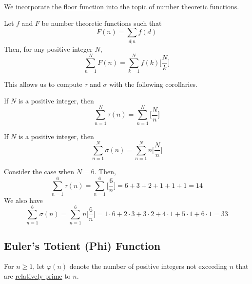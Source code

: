 \documentclass{article}
\newcounter{theorem}[section]
\newcounter{definition}[section]
\newcounter{example}[section]
\begin{document}
We incorporate the \hyperref[def:floor-function]{floor function} into the topic of number theoretic functions. 

\begin{theorem}
  \label{thm:summing-a-divisor-sum-function-over-a-range}
Let $f$ and $F$ be number theoretic functions such that
\begin{equation}
  F(n) = \sum_{d|n} f(d)
\end{equation}
Then, for any positive integer $N$, 
\begin{equation}
  \sum_{n=1}^N F(n) = \sum_{k=1}^N f(k) \bigg[ \frac{N}{k} \bigg]
\end{equation}
\end{theorem}

This allows us to compute $\tau$ and $\sigma$ with the following corollaries. 

\begin{corollary}
  \label{thm:partial-sums-of-tau}
If $N$ is a positive integer, then
\begin{equation}
  \sum_{n=1}^N \tau(n) = \sum_{n=1}^N \bigg[ \frac{N}{n} \bigg]
\end{equation}
\end{corollary}

\begin{corollary}
  \label{thm:partial-sums-of-sigma}
If $N$ is a positive integer, then
\begin{equation}
  \sum_{n=1}^N \sigma(n) = \sum_{n=1}^N n \bigg[ \frac{N}{n} \bigg]
\end{equation}
\end{corollary}

\begin{example}[Partial Sums of $\tau$ for $N = 6$]
  \label{ex:partial-sums-of-tau-for-n6}
Consider the case when $N = 6$. Then, 
\begin{equation}
  \sum_{n=1}^6 \tau(n) = \sum_{n=1}^6 \bigg[ \frac{6}{n} \bigg] = 6 + 3 + 2 + 1 + 1 + 1 = 14
\end{equation}
We also have 
\begin{equation}
  \sum_{n=1}^6 \sigma(n) = \sum_{n=1}^6 n \bigg[ \frac{6}{n} \bigg] = 1 \cdot 6 + 2 \cdot 3 + 3 \cdot 2 + 4 \cdot 1 + 5 \cdot 1 + 6 \cdot 1 = 33
\end{equation}
\end{example}

\subsection{Euler's Totient (Phi) Function}
\begin{definition}
  \label{def:eulers-totient-function}
For $n \geq 1$, let $\varphi(n)$ denote the number of positive integers not exceeding $n$ that are \hyperref[def:relatively-prime]{relatively prime} to $n$. 
\end{definition}
\end{document}
